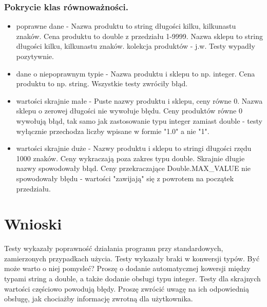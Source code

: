 \documentclass[a4paper,11pt,notitlepage]{article}
\begin{document}
\subsubsection{Pokrycie klas równoważności.}
\begin{itemize}
  \item poprawne dane - Nazwa produktu to string długości kilku, kilkunastu znaków. Cena produktu to double z przedziału 1-9999. Nazwa sklepu to string długości kilku, kilkunastu znaków. kolekcja produktów - j.w. Testy wypadły pozytywnie.
  \item dane o niepoprawnym typie - Nazwa produktu i sklepu to np. integer. Cena produktu to np. string. Wszystkie testy zwróciły błąd.
  \item wartości skrajnie małe - Puste nazwy produktu i sklepu, ceny równe 0. Nazwa sklepu o zerowej długości nie wywołuje błędu. Ceny produktów równe 0 wywołują błąd, tak samo jak zastosowanie typu integer zamiast double - testy wyłącznie przechodza liczby wpisane w formie "1.0" a nie "1".
  \item wartości skrajnie duże - Nazwy produktu i sklepu to stringi długości rzędu 1000 znaków. Ceny wykraczają poza zakres typu double. Skrajnie długie nazwy spowodowały błąd. Ceny przekraczające Double.MAX_VALUE nie spowodowały błędu - wartości "zawijają" się z powrotem na początek przedziału.
\end{itemize}

\section{Wnioski}
Testy wykazały poprawność działania programu przy standardowych, zamierzonych przypadkach użycia. Testy wykazały braki w konwersji typów. Być może warto o niej pomysleć? Proszę o dodanie automatycznej kowersji między typami string a double, a także dodanie obsługi typu integer. Testy dla skrajnych wartości częściowo powodują błędy. Proszę zwrócić uwagę na ich odpowiednią obsługę, jak chociażby informację zwrotną dla użytkownika.
\end{document}
